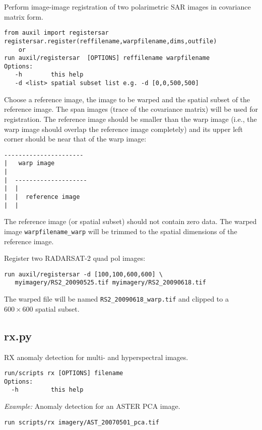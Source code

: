 \documentclass{paper}
\begin{document}
Perform image-image registration of two polarimetric SAR images in covariance matrix form.
\begin{verbatim}
from auxil import registersar
registersar.register(reffilename,warpfilename,dims,outfile)
    or
run auxil/registersar  [OPTIONS] reffilename warpfilename
Options:
   -h        this help
   -d <list> spatial subset list e.g. -d [0,0,500,500]
\end{verbatim}
Choose a reference image, the image to be warped and the spatial subset
of the reference image. The span images (trace of the covariance matrix) will be used for registration. The reference image should be smaller than the warp image  (i.e., the warp image should overlap the reference image completely) and its upper left corner should be near that of the warp image:
\begin{verbatim}
----------------------
|   warp image
|
|  --------------------
|  |
|  |  reference image
|  |
\end{verbatim}
The reference image (or spatial subset) should not contain zero data.
The warped image {\tt warpfilename\_warp} will be trimmed to the spatial
dimensions of the reference image.


 Register two RADARSAT-2 quad pol images:
\begin{lstlisting}
run auxil/registersar -d [100,100,600,600] \
   myimagery/RS2_20090525.tif myimagery/RS2_20090618.tif
\end{lstlisting}
The warped file will be named {\tt RS2\_20090618\_warp.tif} and clipped to a $600\times 600$ spatial subset.

\subsection*{rx.py}
RX anomaly detection for multi- and hyperspectral images.
\begin{verbatim}
run/scripts rx [OPTIONS] filename
Options:
  -h         this help
\end{verbatim}
{\it Example:} Anomaly detection for an ASTER PCA image.
\begin{lstlisting}
run scripts/rx imagery/AST_20070501_pca.tif
\end{lstlisting}
\end{document}
